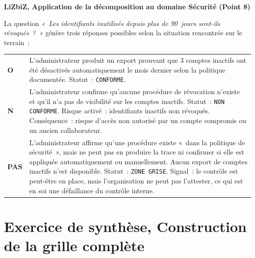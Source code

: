 \begin{boxlizbiz}
\textbf{LiZbiZ, Application de la décomposition au domaine Sécurité (Point 8)}

La question \textit{«~Les identifiants inutilisés depuis plus de 90~jours sont-ils révoqués~?~»} génère trois réponses possibles selon la situation rencontrée sur le terrain~:

\smallskip
\begin{tabular}{p{1.5cm}p{9.5cm}}
\textbf{O} & L'administrateur produit un export prouvant que 3 comptes inactifs ont été désactivés automatiquement le mois dernier selon la politique documentée. Statut~: \texttt{CONFORME}. \\
\addlinespace
\textbf{N} & L'administrateur confirme qu'aucune procédure de révocation n'existe et qu'il n'a pas de visibilité sur les comptes inactifs. Statut~: \texttt{NON CONFORME}. Risque activé~: identifiants inactifs non révoqués. Conséquence~: risque d'accès non autorisé par un compte compromis ou un ancien collaborateur. \\
\addlinespace
\textbf{PAS} & L'administrateur affirme qu'une procédure existe «~dans la politique de sécurité~», mais ne peut pas en produire la trace ni confirmer si elle est appliquée automatiquement ou manuellement. Aucun export de comptes inactifs n'est disponible. Statut~: \texttt{ZONE GRISE}. Signal~: le contrôle est peut-être en place, mais l'organisation ne peut pas l'attester, ce qui est en soi une défaillance du contrôle interne. \\
\end{tabular}
\end{boxlizbiz}


\section{Exercice de synthèse, Construction de la grille complète}
\label{sec:exercice}

